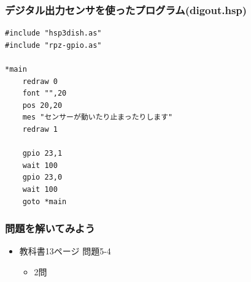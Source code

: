 \begin{frame}[fragile]
    \frametitle{デジタル出力センサを使ったプログラム(digout.hsp)}
\begin{lstlisting}
#include "hsp3dish.as"
#include "rpz-gpio.as"

*main
    redraw 0
    font "",20
    pos 20,20
    mes "センサーが動いたり止まったりします"
    redraw 1

    gpio 23,1
    wait 100
    gpio 23,0
    wait 100
    goto *main
\end{lstlisting}
\end{frame}

\begin{frame}[fragile]
    \frametitle{問題を解いてみよう}
    \begin{itemize}
        \item 教科書13ページ 問題5-4
        \begin{itemize}
            \item 2問
        \end{itemize}
    \end{itemize}
\end{frame}